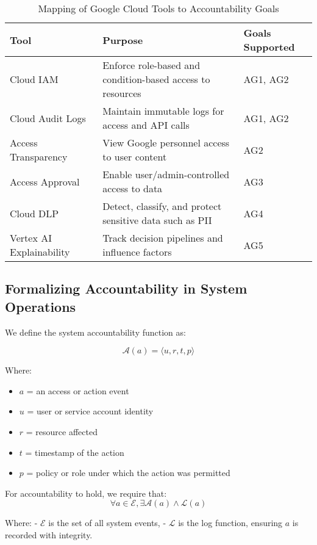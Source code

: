 \documentclass[acmsmall]{acmart}
\begin{document}
\begin{table}[h]
\centering
\caption{Mapping of Google Cloud Tools to Accountability Goals}
\label{tab:tool_mapping}
\begin{tabularx}{\linewidth}{|l|X|l|}
\hline
\textbf{Tool} & \textbf{Purpose} & \textbf{Goals Supported} \\
\hline
Cloud IAM~\cite{gcp_iam} & Enforce role-based and condition-based access to resources & AG1, AG2 \\
\hline
Cloud Audit Logs~\cite{gcp_auditlogs} & Maintain immutable logs for access and API calls & AG1, AG2 \\
\hline
Access Transparency~\cite{gcp_transparency} & View Google personnel access to user content & AG2 \\
\hline
Access Approval~\cite{gcp_accessapproval} & Enable user/admin-controlled access to data & AG3 \\
\hline
Cloud DLP~\cite{gcp_dlp} & Detect, classify, and protect sensitive data such as PII & AG4 \\
\hline
Vertex AI Explainability~\cite{gcp_vertexexplain} & Track decision pipelines and influence factors & AG5 \\
\hline
\end{tabularx}
\end{table}

\subsection{Formalizing Accountability in System Operations}

We define the system accountability function as:

\[
\mathcal{A}(a) = \langle u, r, t, p \rangle
\]

Where:
\begin{itemize}
    \item $a$ = an access or action event
    \item $u$ = user or service account identity
    \item $r$ = resource affected
    \item $t$ = timestamp of the action
    \item $p$ = policy or role under which the action was permitted
\end{itemize}

For accountability to hold, we require that:
\[
\forall a \in \mathcal{E}, \exists \mathcal{A}(a) \wedge \mathcal{L}(a)
\]

Where:
- $\mathcal{E}$ is the set of all system events,
- $\mathcal{L}$ is the log function, ensuring $a$ is recorded with integrity.
\end{document}
